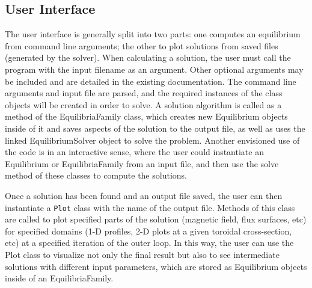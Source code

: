 \documentclass{article}
\begin{document}
\subsection{User Interface}

The user interface is generally split into two parts: one computes an equilibrium from command line arguments; the other to plot solutions from saved files (generated by the solver).
When calculating a solution, the user must call the program with the input filename as an argument.
Other optional arguments may be included and are detailed in the existing documentation.
The command line arguments and input file are parsed, and the required instances of the class objects will be created in order to solve.
A solution algorithm is called as a method of the EquilibriaFamily class, which creates new Equilibrium objects inside of it and saves aspects of the solution to the output file, as well as uses the linked EquilibriumSolver object to solve the problem.
Another envisioned use of the code is in an interactive sense, where the user could instantiate an Equilibrium or EquilibriaFamily from an input file, and then use the solve method of these classes to compute the solutions.

Once a solution has been found and an output file saved, the user can then instantiate a \texttt{Plot} class with the name of the output file.
Methods of this class are called to plot specified parts of the solution (magnetic field, flux surfaces, etc) for specified domains (1-D profiles, 2-D plots at a given toroidal cross-section, etc) at a specified iteration of the outer loop.
In this way, the user can use the Plot class to visualize not only the final result but also to see intermediate solutions with different input parameters, which are stored as Equilibrium objects inside of an EquilibriaFamily.
\end{document}

